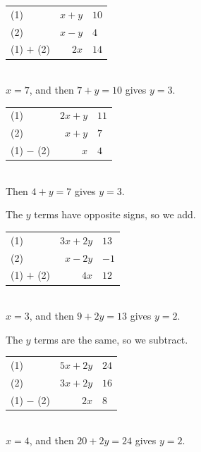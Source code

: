 \documentclass[aspectratio=169]{beamer}
\makeatletter
\newcommand{\by}[1]{{\normalsize #1}}
\newcommand{\simwork}[1]{%
  \begin{tabular}{@{}l@{\qquad}r@{${}={}$}l@{}}#1\end{tabular}%
}
\makeatother
\begin{document}
  {\simwork{\by{(1)} & $x+y$ & $10$\\
            \by{(2)} & $x-y$ & $4$\\
            \by{(1) $+$ (2)} & $2x$ & $14$}\\[0.3em]
   $x=7$, and then $7+y=10$ gives $y=3$.}

  {\simwork{\by{(1)} & $2x+y$ & $11$\\
            \by{(2)} & $x+y$ & $7$\\
            \by{(1) $-$ (2)} & $x$ & $4$}\\[0.3em]
   Then $4+y=7$ gives $y=3$.}

  {The $y$ terms have opposite signs, so we add.
   \par\vspace{0.3em}
   \simwork{\by{(1)} & $3x+2y$ & $13$\\
            \by{(2)} & $x-2y$ & $-1$\\
            \by{(1) $+$ (2)} & $4x$ & $12$}\\[0.3em]
   $x=3$, and then $9+2y=13$ gives $y=2$.}

  {The $y$ terms are the same, so we subtract.
   \par\vspace{0.3em}
   \simwork{\by{(1)} & $5x+2y$ & $24$\\
            \by{(2)} & $3x+2y$ & $16$\\
            \by{(1) $-$ (2)} & $2x$ & $8$}\\[0.3em]
   $x=4$, and then $20+2y=24$ gives $y=2$.}
\end{document}
